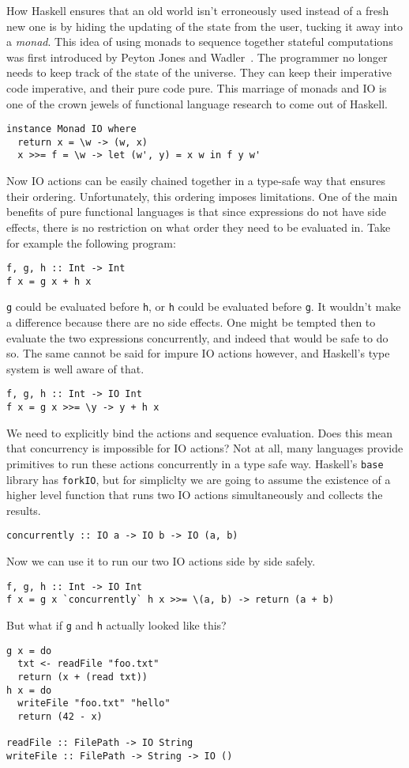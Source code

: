 \documentclass{report}
\begin{document}
How Haskell ensures that an old world isn't erroneously used instead of a
fresh new one is by hiding the updating of the state from the user, tucking it
away into a \textit{monad}. This idea of using monads to sequence together
stateful computations was first introduced by Peyton Jones and
Wadler~\cite{peytonjones1993}\cite{wadler1995}. The programmer no longer needs
to keep track of the state of the universe. They can keep their imperative code
imperative, and their pure code pure. This marriage of monads and IO is one of
the crown jewels of functional language research to come out of Haskell.
\begin{verbatim}
instance Monad IO where
  return x = \w -> (w, x)
  x >>= f = \w -> let (w', y) = x w in f y w'
\end{verbatim}
Now IO actions can be easily chained together in a type-safe way that ensures
their ordering.  Unfortunately, this ordering imposes limitations. One of the
main benefits of pure functional languages is that since expressions do not
have side effects, there is no restriction on what order they need to be
evaluated in.  Take for example the following program:
\begin{verbatim}
f, g, h :: Int -> Int
f x = g x + h x
\end{verbatim}
\texttt{g} could be evaluated before \texttt{h}, or \texttt{h} could be
evaluated before \texttt{g}. It wouldn't make a difference because there are no
side effects. One might be tempted then to evaluate the two expressions
concurrently, and indeed that would be safe to do so.  The same cannot be said
for impure IO actions however, and Haskell's type system is well aware of that.
\begin{verbatim}
f, g, h :: Int -> IO Int
f x = g x >>= \y -> y + h x
\end{verbatim}
We need to explicitly bind the actions and sequence evaluation.  Does this mean
that concurrency is impossible for IO actions? Not at all, many languages
provide primitives to run these actions concurrently in a type safe
way. Haskell's \texttt{base} library has \texttt{forkIO}, but for
simpliclty we are going to assume the existence of a higher level function that
runs two IO actions simultaneously and collects the results.
\begin{verbatim}
concurrently :: IO a -> IO b -> IO (a, b)
\end{verbatim}
Now we can use it to run our two IO actions side by side safely. 
\begin{verbatim}
f, g, h :: Int -> IO Int
f x = g x `concurrently` h x >>= \(a, b) -> return (a + b)
\end{verbatim}
But what if \texttt{g} and \texttt{h} actually looked like this?
\begin{verbatim}
g x = do
  txt <- readFile "foo.txt"
  return (x + (read txt))
h x = do
  writeFile "foo.txt" "hello"
  return (42 - x)

readFile :: FilePath -> IO String
writeFile :: FilePath -> String -> IO ()
\end{verbatim}
\end{document}
